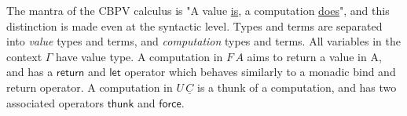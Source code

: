 \documentclass[11pt,twoside]{article}
\begin{document}
The mantra of the CBPV calculus is "A value \underline{is}, a computation \underline{does}", and this distinction is made even at the syntactic level.
Types and terms are separated into \textit{value} types and terms, and \textit{computation} types and terms.
All variables in the context $\Gamma$ have value type.
A computation in $F \, A$ aims to return a value in A, and has a $\mathsf{return}$ and $\mathsf{let}$ operator which behaves similarly to a monadic bind and return operator. 
A computation in $U \, \underline{C}$ is a thunk of a computation, and has two associated operators $\mathsf{thunk}$ and $\mathsf{force}$.


\end{document}
